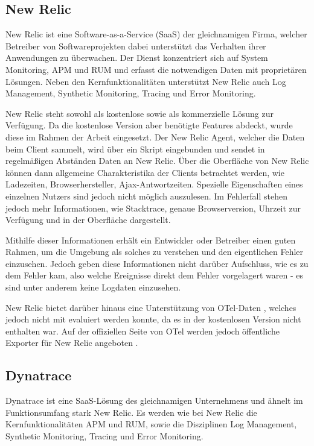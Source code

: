 \subsection{New Relic}

New Relic \cite{NewRelic} ist eine Software-as-a-Service (SaaS) der gleichnamigen Firma, welcher Betreiber von Softwareprojekten dabei unterstützt das Verhalten ihrer Anwendungen zu überwachen. Der Dienst konzentriert sich auf System Monitoring, APM und RUM und erfasst die notwendigen Daten mit proprietären Lösungen. Neben den Kernfunktionalitäten unterstützt New Relic auch Log Management, Synthetic Monitoring, Tracing und Error Monitoring.


New Relic steht sowohl als kostenlose sowie als kommerzielle Lösung zur Verfügung. Da die kostenlose Version aber benötigte Features abdeckt, wurde diese im Rahmen der Arbeit eingesetzt. Der New Relic Agent, welcher die Daten beim Client sammelt, wird über ein Skript eingebunden und sendet in regelmäßigen Abständen Daten an New Relic. Über die Oberfläche von New Relic können dann allgemeine Charakteristika der Clients betrachtet werden, wie Ladezeiten, Browserhersteller, Ajax-Antwortzeiten. Spezielle Eigenschaften eines einzelnen Nutzers sind jedoch nicht möglich auszulesen. Im Fehlerfall stehen jedoch mehr Informationen, wie Stacktrace, genaue Browserversion, Uhrzeit zur Verfügung und in der Oberfläche dargestellt.

Mithilfe dieser Informationen erhält ein Entwickler oder Betreiber einen guten Rahmen, um die Umgebung als solches zu verstehen und den eigentlichen Fehler einzusehen. Jedoch geben diese Informationen nicht darüber Aufschluss, wie es zu dem Fehler kam, also welche Ereignisse direkt dem Fehler vorgelagert waren - es sind unter anderem keine Logdaten einzusehen.

New Relic bietet darüber hinaus eine Unterstützung von OTel-Daten  \cite{NewRelicAnnoundOTelBetaSupport}, welches jedoch nicht mit evaluiert werden konnte, da es in der kostenlosen Version nicht enthalten war. Auf der offiziellen Seite von OTel werden jedoch  öffentliche Exporter für New Relic angeboten \cite{OpenTelemetryRegistry}.

\subsection{Dynatrace}

Dynatrace \cite{Dynatrace} ist eine SaaS-Lösung des gleichnamigen Unternehmens und ähnelt im Funktionsumfang stark New Relic. Es werden wie bei New Relic die Kernfunktionalitäten APM und RUM, sowie die Disziplinen Log Management, Synthetic Monitoring, Tracing und Error Monitoring.

